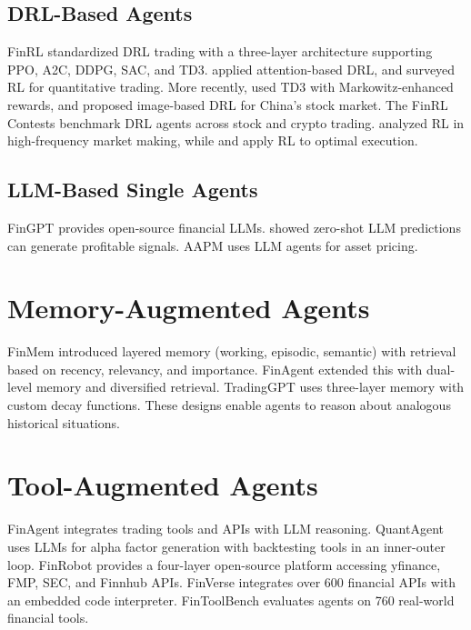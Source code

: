 \documentclass[12pt]{report}
\begin{document}
\subsection{DRL-Based Agents}

FinRL \citep{liu2020finrl,liu2021finrl} standardized DRL trading with a three-layer architecture supporting PPO, A2C, DDPG, SAC, and TD3. \citet{zhang2020deep} applied attention-based DRL, and \citet{sun2021reinforcement} surveyed RL for quantitative trading. More recently, \citet{drl2024portfolioselection} used TD3 with Markowitz-enhanced rewards, and \citet{huang2024drlportfolio} proposed image-based DRL for China's stock market. The FinRL Contests \citep{wang2025finrlcontests} benchmark DRL agents across stock and crypto trading. \citet{zheng2024rlhfmm} analyzed RL in high-frequency market making, while \citet{hafsi2024optimalexecution} and \citet{zakaria2025drlorder} apply RL to optimal execution.

\subsection{LLM-Based Single Agents}

FinGPT \citep{yang2023fingpt} provides open-source financial LLMs. \citet{lopez2023can} showed zero-shot LLM predictions can generate profitable signals. AAPM \citep{cheng2024aapm} uses LLM agents for asset pricing.

\section{Memory-Augmented Agents}

FinMem \citep{yu2023finmem} introduced layered memory (working, episodic, semantic) with retrieval based on recency, relevancy, and importance. FinAgent \citep{zhang2024finagent} extended this with dual-level memory and diversified retrieval. TradingGPT \citep{li2023tradinggpt} uses three-layer memory with custom decay functions. These designs enable agents to reason about analogous historical situations.

\section{Tool-Augmented Agents}

FinAgent \citep{zhang2024finagent} integrates trading tools and APIs with LLM reasoning. QuantAgent \citep{wang2024quantagent} uses LLMs for alpha factor generation with backtesting tools in an inner-outer loop. FinRobot \citep{yang2024finrobot} provides a four-layer open-source platform accessing yfinance, FMP, SEC, and Finnhub APIs. FinVerse \citep{an2024finverse} integrates over 600 financial APIs with an embedded code interpreter. FinToolBench \citep{fintoolbench2026} evaluates agents on 760 real-world financial tools.
\end{document}
